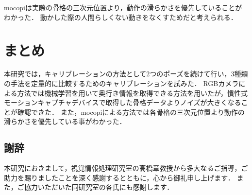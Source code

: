 \documentclass[a4j, fleqn, 12pt]{jsreport}
\begin{document}
mocopiは実際の骨格の三次元位置より，動作の滑らかさを優先していることがわかった．
動かした際の人間らしくない動きをなくすためだと考えられる．

\chapter{まとめ}
本研究では，キャリブレーションの方法として2つのポーズを続けて行い，3種類の手法を定量的に比較するためのキャリブレーションを試みた．
RGBカメラによる方法では機械学習を用いて奥行き情報を取得できる方法を用いたが，慣性式モーションキャプチャデバイスで取得した骨格データよりノイズが大きくなることが確認できた．
また，mocopiによる方法では各骨格の三次元位置より動作の滑らかさを優先している事がわかった．

\section*{謝辞}
本研究におきまして，視覚情報処理研究室の高橋章教授から多大なるご指導，ご助力を賜りましたことを深く感謝するとともに，心から御礼申し上げます．
また，ご協力いただいた同研究室の各氏にも感謝します．

\begin{thebibliography}{99}
  \small{
  }
\end{thebibliography}
\end{document}
